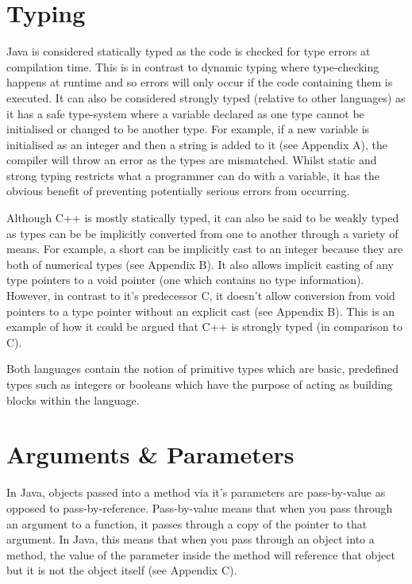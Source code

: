 \documentclass[]{report}
\begin{document}
\section{Typing}
Java is considered statically typed as the code is checked for type errors at compilation time. This is in contrast to dynamic typing where type-checking happens at runtime and so errors will only occur if the code containing them is executed. It can also be considered strongly typed (relative to other languages) as it has a safe type-system where a variable declared as one type cannot be initialised or changed to be another type. For example, if a new variable is initialised as an integer and then a string is added to it (see Appendix A), the compiler will throw an error as the types are mismatched. Whilst static and strong typing restricts what a programmer can do with a variable, it has the obvious benefit of preventing potentially serious errors from occurring.\cite{Typing}	

Although C++ is mostly statically typed, it can also be said to be weakly typed as types can be be implicitly converted from one to another through a variety of means. For example, a short can be implicitly cast to an integer because they are both of numerical types (see Appendix B). It also allows implicit casting of any type pointers to a void pointer (one which contains no type information). However, in contrast to it's predecessor C, it doesn't allow conversion from void pointers to a type pointer without an explicit cast (see Appendix B). This is an example of how it could be argued that C++ is strongly typed (in comparison to C). \cite{Typing}

Both languages contain the notion of primitive types which are basic, predefined types such as integers or booleans which have the purpose of acting as building blocks within the language.

\section{Arguments \& Parameters}
In Java, objects passed into a method via it's parameters are pass-by-value as opposed to pass-by-reference. Pass-by-value means that when you pass through an argument to a function, it passes through a copy of the pointer to that argument. In Java, this means that when you pass through an object into a method, the value of the parameter inside the method will reference that object but it is not the object itself (see Appendix C). \cite{ParametersJava}
\end{document}
